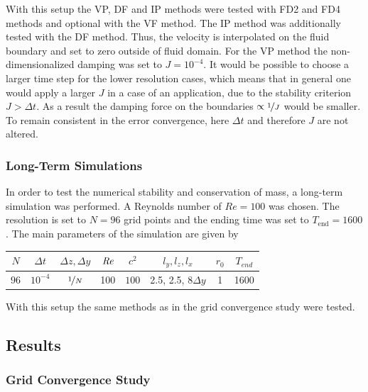 With this setup the VP, DF and IP methods were tested with FD2 and FD4 methods and optional with the VF method.
The IP method was additionally tested with the DF method. Thus, the velocity is interpolated on the
fluid boundary and set to zero outside of fluid domain.
For the VP method the non-dimensionalized damping was set to $J=10^{-4}$.
It would be possible to choose a larger time step for the lower resolution cases, which means that in general
one would apply a larger $J$ in a case of an application, due to the stability criterion $J>\Delta t$.
As a result the damping force on the boundaries $\propto \nicefrac{1}{J}$ would be smaller.
To remain consistent in the error convergence, here $\Delta t$ and
therefore $J$ are not altered.

\subsubsection{Long-Term Simulations}

In order to test the  numerical stability and conservation of mass, a long-term simulation was performed.
A Reynolds number of $Re=100$ was chosen. The resolution is set to $N=96$ grid points and
the ending time was set to $T_{\text{end}}=1600$.
The main parameters of the simulation are  given by

\begin{center}
\vspace*{0.7ex}
\begin{tabular}{c|c|c|c|c|c|c|c }
 $ N  $                   & $\Delta t$ & $\Delta z, \Delta y$            & $\mbox{\textit{Re}}$  & $c^2$   & $l_y, l_z, l_x $ &$r_0$ & $T_{end}$\\
\hline
 $96 $& $10^{-4}$ & $\nicefrac{1}{N}$ & 100     & $100$   & 2.5, 2.5, $8\Delta y $ & 1     & 1600\\
\end{tabular}
\vspace*{0.7ex}
\end{center}

With this setup the same methods as in the grid convergence study were tested.

\subsection{Results}

\subsubsection{Grid Convergence Study}

